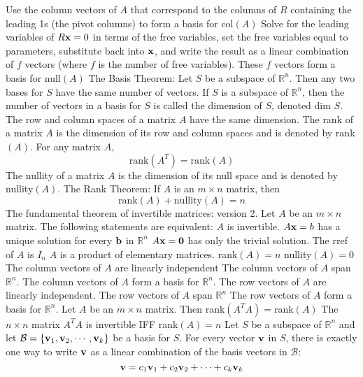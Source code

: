 \documentclass{article}
\begin{document}
\begin{outline}
                \2 Use the column vectors of \(A\) that correspond to the columns of $R$ containing the leading 1s (the pivot columns) to form a basis for col\((A)\)
                \2 Solve for the leading variables of \(R\vb x=0\) in terms of the free variables, set the free variables equal to parameters, substitute back into \(\vb x\), and write the result as a linear combination of $f$ vectors (where $f$ is the number of free variables). These $f$ vectors form a basis for null\((A)\)
            \1 The Basis Theorem: Let $S$ be a subspace of \(\mathbb R^n\). Then any two bases for $S$ have the same number of vectors. 
            \1 If $S$ is a subspace of \(\mathbb R^n\), then the number of vectors in a basis for $S$ is called the dimension of $S$, denoted dim $S$. 
            \1 The row and column spaces of a matrix $A$ have the same dimension. 
            \1 The rank of a matrix $A$ is the dimension of its row and column spaces and is denoted by rank\((A)\). 
            \1 For any matrix $A$, \[\text{rank}(A^T)=\text{rank}(A)\]
            \1 The nullity of a matrix $A$ is the dimension of its null space and is denoted by nullity\((A)\). 
            \1 The Rank Theorem: If \(A\) is an \(m\times n\) matrix, then \[\text{rank}(A)+\text{nullity}(A)=n\]
            \1 The fundamental theorem of invertible matrices: version 2. Let \(A\) be an \(m\times n\) matrix. The following statements are equivalent: 
                \2 \(A\) is invertible. 
                \2 \(A\vb x=b\) has a unique solution for every \(\vb b\) in \(\mathbb R^n\)
                \2 \(A\vb x=\vb 0\) has only the trivial solution. 
                \2 The rref of $A$  is \(I_n\)
                \2 \(A\) is a product of elementary matrices. 
                \2 rank\((A)=n\)
                \2 nullity\((A)=0\)
                \2 The column vectors of \(A\) are linearly independent 
                \2 The column vectors of \(A\) span \(\mathbb R^n\). 
                \2 The column vectors of \(A\) form a basis for \(\mathbb R^n\). 
                \2 The row vectors of \(A\) are linearly independent. 
                \2 The row vectors of \(A\) span \(\mathbb R^n\)
                \2 The row vectors of \(A\) form a basis for \(\mathbb R^n\). 
            \1 Let \(A\) be an \(m\times n\) matrix. Then 
                \2 rank\((A^TA)=\text{rank}(A)\)
                \2 The \(n\times n\) matrix \(A^TA\) is invertible IFF rank\((A)=n\)
            \1 Let $S$ be a subspace of \(\mathbb R^n\) and let \(\mathcal B=\{\vb v_1,\vb v_2,\cdots,\vb v_k\}\) be a basis for $S$. For every vector \(\vb v\) in $S$, there is exactly one way to write \(\vb v\) as a linear combination of the basis vectors in \(\mathcal B\): \[\vb v=c_1\vb v_1+c_2\vb v_2+\cdots+c_k\vb v_k\]

\end{outline}
\end{document}
